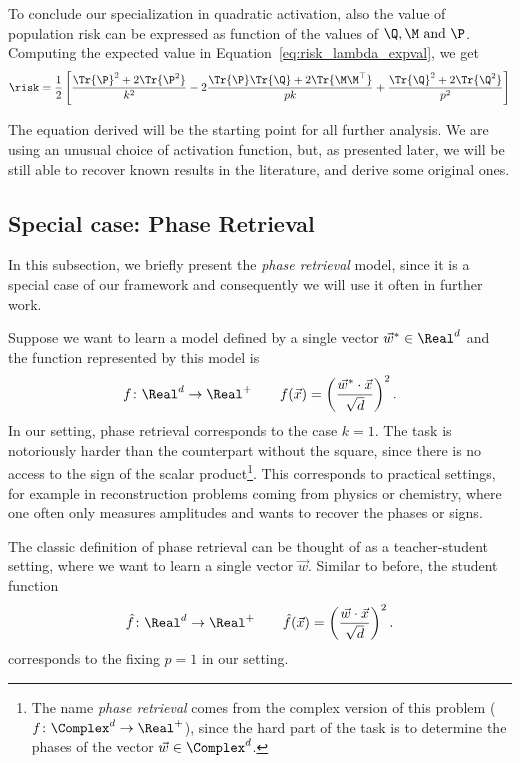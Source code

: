 To conclude our specialization in quadratic activation, also the value of population risk can be expressed
as function of the values of \(\Q, \M \text{ and } \P\). Computing the expected value in Equation~\eqref{eq:risk_lambda_expval},
we get
\begin{equation} \label{eq:risk_quadratic}
  \risk%
      = \frac12\left[
          \frac{\Tr{\P}^2+2\Tr{\P^2}}{k^2}
          -2\frac{\Tr{\P}\Tr{\Q}+2\Tr{\M\M^\top}}{pk}
          +\frac{\Tr{\Q}^2+2\Tr{\Q^2}}{p^2}
      \right]
\end{equation}

The equation derived will be the starting point for all further analysis.
We are using an unusual choice of activation function, but, as presented later,
we will be still able to recover known results in the literature, and derive some original
ones.

\subsection{Special case: Phase Retrieval}\label{subsec:phase_retrieval}
In this subsection, we briefly present the \emph{phase retrieval} model,
since it is a special case of our framework and consequently we will use it often in further work.

Suppose we want to learn a model defined by 
a single vector \(\vec{w}^* \in \Real^d\) and the function represented by this model is 
\[
  f\colon \Real^d \to \Real^+ \qquad f{(\vec{x})} = \left(\frac{\vec{w}^*\cdot\vec{x}}{\sqrt{d}}\right)^2.
\]
In our setting, phase retrieval corresponds to the case \(k=1\). The task is notoriously
harder than the counterpart without the square, since there is no access to the sign of 
the scalar product\footnote{
  The name \emph{phase retrieval} comes from the complex version of this problem (\(f\colon \Complex^d \to \Real^+\)),
  since the hard part of the task is to determine the phases of the vector \(\vec{w}\in\Complex^d\).
}. This corresponds to practical settings, for example in reconstruction problems coming from physics or chemistry, where one often only measures amplitudes and wants to recover the phases or signs.

The classic definition of phase retrieval can be thought of as a teacher-student setting, where we want to learn
a single vector \(\vec{w}\). Similar to before, the student function 
\[
  \hat{f}\colon \Real^d \to \Real^+ \qquad \hat{f}{(\vec{x})} = \left(\frac{\vec{w}\cdot\vec{x}}{\sqrt{d}}\right)^2.
\]
corresponds to the fixing \(p=1\) in our setting. 

